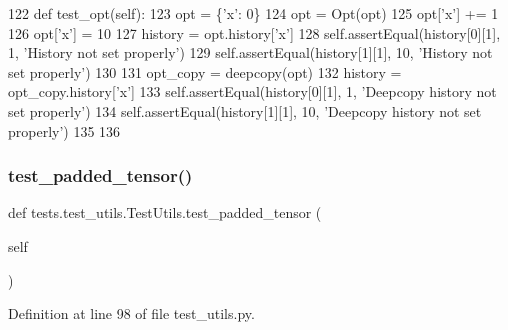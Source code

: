 \begin{DoxyCode}
122     \textcolor{keyword}{def }test\_opt(self):
123         opt = \{\textcolor{stringliteral}{'x'}: 0\}
124         opt = Opt(opt)
125         opt[\textcolor{stringliteral}{'x'}] += 1
126         opt[\textcolor{stringliteral}{'x'}] = 10
127         history = opt.history[\textcolor{stringliteral}{'x'}]
128         self.assertEqual(history[0][1], 1, \textcolor{stringliteral}{'History not set properly'})
129         self.assertEqual(history[1][1], 10, \textcolor{stringliteral}{'History not set properly'})
130 
131         opt\_copy = deepcopy(opt)
132         history = opt\_copy.history[\textcolor{stringliteral}{'x'}]
133         self.assertEqual(history[0][1], 1, \textcolor{stringliteral}{'Deepcopy history not set properly'})
134         self.assertEqual(history[1][1], 10, \textcolor{stringliteral}{'Deepcopy history not set properly'})
135 
136 
\end{DoxyCode}
\mbox{\label{classtests_1_1test__utils_1_1TestUtils_a9d3d0280ce67a3e6b039b9184844dc45}} 
\subsubsection{\texorpdfstring{test\+\_\+padded\+\_\+tensor()}{test\_padded\_tensor()}}
{\footnotesize\ttfamily def tests.\+test\+\_\+utils.\+Test\+Utils.\+test\+\_\+padded\+\_\+tensor (\begin{DoxyParamCaption}\item[{}]{self }\end{DoxyParamCaption})}



Definition at line 98 of file test\+\_\+utils.\+py.



